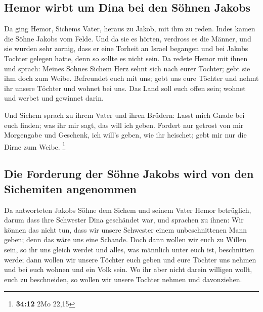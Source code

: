 \hypertarget{hemor-wirbt-um-dina-bei-den-suxf6hnen-jakobs}{%
\subsection{Hemor wirbt um Dina bei den Söhnen
Jakobs}\label{hemor-wirbt-um-dina-bei-den-suxf6hnen-jakobs}}

 Da ging Hemor, Sichems Vater, heraus zu Jakob, mit ihm zu
reden.  Indes kamen die Söhne Jakobs vom Felde. Und da sie
es hörten, verdross es die Männer, und sie wurden sehr zornig, dass er
eine Torheit an Israel begangen und bei Jakobs Tochter gelegen hatte,
denn so sollte es nicht sein.  Da redete Hemor mit ihnen
und sprach: Meines Sohnes Sichem Herz sehnt sich nach eurer Tochter;
gebt sie ihm doch zum Weibe.  Befreundet euch mit uns;
gebt uns eure Töchter und nehmt ihr unsere Töchter  und
wohnet bei uns. Das Land soll euch offen sein; wohnet und werbet und
gewinnet darin.

 Und Sichem sprach zu ihrem Vater und ihren Brüdern:
Lasst mich Gnade bei euch finden; was ihr mir sagt, das will ich geben.
 Fordert nur getrost von mir Morgengabe und Geschenk, ich
will's geben, wie ihr heischet; gebt mir nur die Dirne zum Weibe.
\footnote{\textbf{34:12} 2Mo 22,15}

\hypertarget{die-forderung-der-suxf6hne-jakobs-wird-von-den-sichemiten-angenommen}{%
\subsection{Die Forderung der Söhne Jakobs wird von den Sichemiten
angenommen}\label{die-forderung-der-suxf6hne-jakobs-wird-von-den-sichemiten-angenommen}}

 Da antworteten Jakobs Söhne dem Sichem und seinem Vater
Hemor betrüglich, darum dass ihre Schwester Dina geschändet war,
 und sprachen zu ihnen: Wir können das nicht tun, dass
wir unsere Schwester einem unbeschnittenen Mann geben; denn das wäre uns
eine Schande.  Doch dann wollen wir euch zu Willen sein,
so ihr uns gleich werdet und alles, was männlich unter euch ist,
beschnitten werde;  dann wollen wir unsere Töchter euch
geben und eure Töchter uns nehmen und bei euch wohnen und ein Volk sein.
 Wo ihr aber nicht darein willigen wollt, euch zu
beschneiden, so wollen wir unsere Tochter nehmen und davonziehen.

